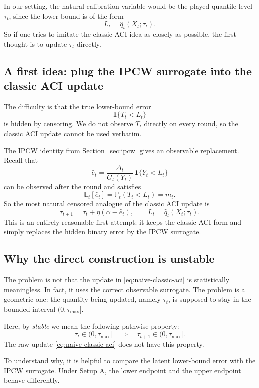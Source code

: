 \documentclass[11pt]{article}
\newcommand{\E}{\mathbb{E}}
\newcommand{\Prob}{\mathbb{P}}
\newcommand{\1}{\mathbf{1}}
\begin{document}
In our setting, the natural calibration variable would be the played quantile level $\tau_t$, since the lower bound is of the form
\[
L_t=\hat q_t(X_t;\tau_t).
\]
So if one tries to imitate the classic ACI idea as closely as possible, the first thought is to update $\tau_t$ directly.

\subsection{A first idea: plug the IPCW surrogate into the classic ACI update}

The difficulty is that the true lower-bound error
\[
\1\{T_t< L_t\}
\]
is hidden by censoring. We do not observe $T_t$ directly on every round, so the classic ACI update cannot be used verbatim.

The IPCW identity from Section~\ref{sec:ipcw} gives an observable replacement. Recall that
\[
\hat e_t
=
\frac{\Delta_t}{G_t(Y_t)}\,\1\{Y_t< L_t\}
\]
can be observed after the round and satisfies
\[
\E_t[\hat e_t]=\Prob_t(T_t< L_t)=m_t.
\]
So the most natural censored analogue of the classic ACI update is
\begin{equation}
\label{eq:naive-classic-aci}
\tau_{t+1}=\tau_t+\eta(\alpha-\hat e_t),
\qquad
L_t=\hat q_t(X_t;\tau_t).
\end{equation}
This is an entirely reasonable first attempt: it keeps the classic ACI form and simply replaces the hidden binary error by the IPCW surrogate.

\subsection{Why the direct construction is unstable}

The problem is not that the update in \eqref{eq:naive-classic-aci} is statistically meaningless. In fact, it uses the correct observable surrogate. The problem is a geometric one: the quantity being updated, namely $\tau_t$, is supposed to stay in the bounded interval $(0,\tau_{\max}]$.

Here, by \emph{stable} we mean the following pathwise property:
\[
\tau_t\in(0,\tau_{\max}]
\quad\Longrightarrow\quad
\tau_{t+1}\in(0,\tau_{\max}].
\]
The raw update \eqref{eq:naive-classic-aci} does not have this property.

To understand why, it is helpful to compare the latent lower-bound error with the IPCW surrogate. Under Setup A, the lower endpoint and the upper endpoint behave differently.
\end{document}
